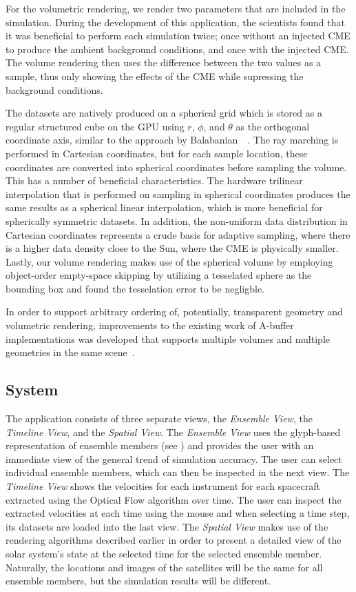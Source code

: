 For the volumetric rendering, we render two parameters that are included in the simulation.  During the development of this application, the scientists found that it was beneficial to perform each simulation twice; once without an injected CME to produce the ambient background conditions, and once with the injected CME.  The volume rendering then uses the difference between the two values as a sample, thus only showing the effects of the CME while supressing the background conditions.

The datasets are natively produced on a spherical grid which is stored as a regular structured  cube on the GPU using $r$, $\phi$, and $\theta$ as the orthogonal coordinate axis, similar to the approach by Balabanian~\etal~\cite{balabanian2007sonar}.  The ray marching is performed in Cartesian coordinates, but for each sample location, these coordinates are converted into spherical coordinates before sampling the volume.  This has a number of beneficial characteristics.  The hardware trilinear interpolation that is performed on sampling in spherical coordinates produces the same results as a spherical linear interpolation, which is more beneficial for spherically symmetric datasets.  In addition, the non-uniform data distribution in Cartesian coordinates represents a crude basis for adaptive sampling, where there is a higher data density close to the Sun, where the CME is physically smaller.  Lastly, our volume rendering makes use of the spherical volume by employing object-order empty-space skipping by utilizing a tesselated sphere as the bounding box and found the tesselation error to be negligble.

In order to support arbitrary ordering of, potentially, transparent geometry and volumetric rendering, improvements to the existing work of A-buffer implementations was developed that supports multiple volumes and multiple geometries in the same scene~\cite{lindholm14hybrid}.


\subsection{System} \label{contributions:astro:spaceweather:system}
The application consists of three separate views, the \emph{Ensemble View}, the \emph{Timeline View}, and the \emph{Spatial View}.  The \emph{Ensemble View} uses the glyph-based representation of ensemble members (see ) and provides the user with an immediate view of the general trend of simulation accuracy.  The user can select individual ensemble members, which can then be inspected in the next view.  The \emph{Timeline View} shows the velocities for each instrument for each spacecraft extracted using the Optical Flow algorithm over time.  The user can inspect the extracted velocities at each time using the mouse and when selecting a time step, its datasets are loaded into the last view.  The \emph{Spatial View} makes use of the rendering algorithms described earlier in order to present a detailed view of the solar system's state at the selected time for the selected ensemble member.  Naturally, the locations and images of the satellites will be the same for all ensemble members, but the simulation results will be different.


